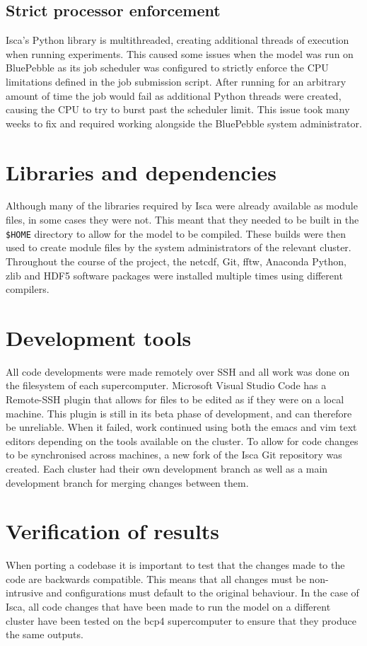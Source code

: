 \documentclass[a4paper,11pt]{report}
\begin{document}
\subsection{Strict processor enforcement}
Isca's Python library is multithreaded, creating additional threads of execution when running experiments. This caused some issues when the model was run on BluePebble as its job scheduler was configured to strictly enforce the CPU limitations defined in the job submission script. After running for an arbitrary amount of time the job would fail as additional Python threads were created, causing the CPU to try to burst past the scheduler limit. This issue took many weeks to fix and required working alongside the BluePebble system administrator. 



\section{Libraries and dependencies}
Although many of the libraries required by Isca were already available as module files, in some cases they were not. This meant that they needed to be built in the \texttt{\$HOME} directory to allow for the model to be compiled. These builds were then used to create module files by the system administrators of the relevant cluster. Throughout the course of the project, the \gls{netcdf}, Git, \gls{fftw}, Anaconda Python, zlib and HDF5 software packages were installed multiple times using different compilers. 

\section{Development tools}
All code developments were made remotely over SSH and all work was done on the filesystem of each supercomputer. Microsoft Visual Studio Code has a Remote-SSH plugin that allows for files to be edited as if they were on a local machine. This plugin is still in its beta phase of development, and can therefore be unreliable. When it failed, work continued using both the emacs and vim text editors depending on the tools available on the cluster. To allow for code changes to be synchronised across machines, a new fork of the Isca Git repository was created. Each cluster had their own development branch as well as a main development branch for merging changes between them. 



\section{Verification of results}
When porting a codebase it is important to test that the changes made to the code are backwards compatible. This means that all changes must be non-intrusive and configurations must default to the original behaviour. In the case of Isca, all code changes that have been made to run the model on a different cluster have been tested on the \gls{bcp4} supercomputer to ensure that they produce the same outputs.
\end{document}
